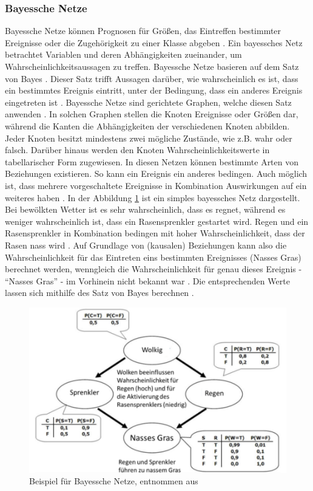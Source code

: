 \subsubsection{Bayessche Netze}
Bayessche Netze können Prognosen für Größen, das Eintreffen bestimmter Ereignisse oder die Zugehörigkeit zu einer Klasse abgeben \cite{Dorn.2018, dehen2012bayes}. Ein bayessches Netz betrachtet Variablen und deren Abhängigkeiten zueinander, um Wahrscheinlichkeitsaussagen zu treffen. Bayessche Netze basieren auf dem Satz von Bayes \cite{dobel2018maschinelles}. Dieser Satz trifft Aussagen darüber, wie wahrscheinlich es ist, dass ein bestimmtes Ereignis eintritt, unter der Bedingung, dass ein anderes Ereignis eingetreten ist \cite{Dorn.2018}. Bayessche Netze sind gerichtete Graphen, welche diesen Satz anwenden \cite{Dorn.2018, dobel2018maschinelles}. In solchen Graphen stellen die Knoten Ereignisse oder Größen dar, während die Kanten die Abhängigkeiten der verschiedenen Knoten abbilden. Jeder Knoten besitzt mindestens zwei mögliche Zustände, wie z.B. wahr oder falsch. Darüber hinaus werden den Knoten Wahrscheinlichkeitswerte in tabellarischer Form zugewiesen. In diesen Netzen können bestimmte Arten von Beziehungen existieren. So kann ein Ereignis ein anderes bedingen. Auch möglich ist, dass mehrere vorgeschaltete Ereignisse in Kombination Auswirkungen auf ein weiteres haben \cite{dehen2012bayes}. In der Abbildung \ref{Fig:bnetz} ist ein simples bayessches Netz dargestellt. Bei bewölkten Wetter ist es sehr wahrscheinlich, dass es regnet, während es weniger wahrscheinlich ist, dass ein Rasensprenkler gestartet wird. Regen und ein Rasensprenkler in Kombination bedingen mit hoher Wahrscheinlichkeit, dass der Rasen nass wird \cite{dobel2018maschinelles}. Auf Grundlage von (kausalen) Beziehungen kann also die Wahrscheinlichkeit für das Eintreten eins bestimmten Ereignisses (Nasses Gras) berechnet werden, wenngleich die Wahrscheinlichkeit für genau dieses Ereignis - \enquote{Nasses Gras} - im Vorhinein nicht bekannt war \cite{dobel2018maschinelles, dehen2012bayes}. Die entsprechenden Werte lassen sich mithilfe des Satz von Bayes berechnen \cite{dehen2012bayes}.
\begin{figure}
    \centering
    \includegraphics[scale=0.5]{pic/MA-Bilder/bayesNetz.PNG}
    \caption{Beispiel für Bayessche Netze, entnommen aus \cite{dobel2018maschinelles}}
    \label{Fig:bnetz}
\end{figure}%

